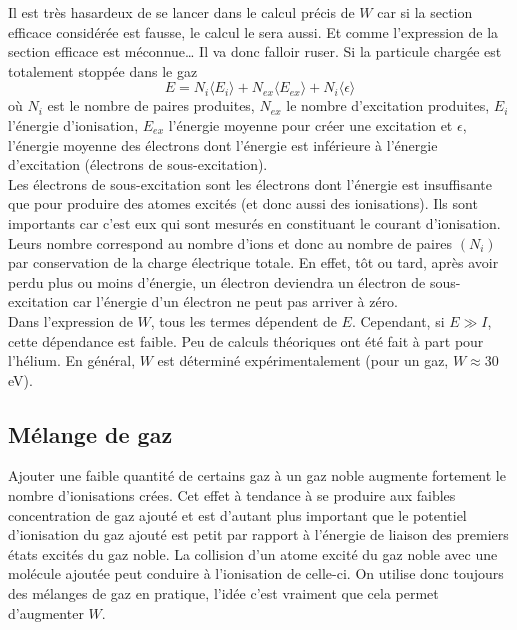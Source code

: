 Il est très hasardeux de se lancer dans le calcul précis de $W$ car si la section efficace considérée
est fausse, le calcul le sera aussi. Et comme l'expression de la section efficace est méconnue\dots
Il va donc falloir ruser. Si la particule chargée est totalement stoppée dans le gaz
\begin{equation}
E=N_i\langle E_i\rangle +N_{ex}\langle E_{ex}\rangle+N_i\langle \epsilon\rangle
\end{equation}
où $N_i$ est le nombre de paires produites, $N_{ex}$ le nombre d'excitation produites, $E_i$ 
l'énergie d'ionisation, $E_{ex}$ l'énergie moyenne pour créer une excitation et $\epsilon$, 
l'énergie moyenne des électrons dont l'énergie est inférieure à l'énergie d'excitation 
(électrons de sous-excitation).\\

Les électrons de sous-excitation sont les électrons dont l'énergie est insuffisante que pour 
produire des atomes excités (et donc aussi des ionisations). Ils sont importants car c'est eux
qui sont mesurés en constituant le courant d'ionisation. Leurs nombre correspond au nombre d'ions
et donc au nombre de paires $(N_i)$ par conservation de la charge électrique totale. En effet, 
tôt ou tard, après avoir perdu plus ou moins d'énergie, un électron deviendra un électron de 
sous-excitation car l'énergie d'un électron ne peut pas arriver à zéro. \\

Dans l'expression de $W$, tous les termes dépendent de $E$. Cependant, si $E\gg I$, cette 
dépendance est faible. Peu de calculs théoriques ont été fait à part pour l'hélium. En 
général, $W$ est déterminé expérimentalement (pour un gaz, $W\approx 30$ eV).

\subsection{Mélange de gaz}
Ajouter une faible quantité de certains gaz à un gaz noble augmente fortement le nombre d'ionisations
crées. Cet effet à tendance à se produire aux faibles concentration de gaz ajouté et est d'autant plus
important que le potentiel d'ionisation du gaz ajouté est petit par rapport à l'énergie de liaison des 
premiers états excités du gaz noble. La collision d'un atome excité du gaz noble avec une molécule
ajoutée peut conduire à l'ionisation de celle-ci. On utilise donc toujours des mélanges de gaz 
en pratique, l'idée c'est vraiment que cela permet d'augmenter $W$.


